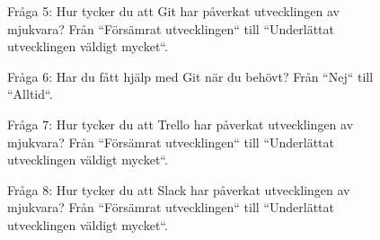 \begin{figure}[!h]
	\centering
	\caption{Fråga 5: Hur tycker du att Git har påverkat utvecklingen av mjukvara? Från ``Försämrat utvecklingen`` till ``Underlättat utvecklingen väldigt mycket``.}
\end{figure}

\begin{figure}[!h]
	\centering
	\caption{Fråga 6: Har du fått hjälp med Git när du behövt? Från ``Nej`` till ``Alltid``.}
\end{figure}

\begin{figure}[!h]
	\centering
	\caption{Fråga 7: Hur tycker du att Trello har påverkat utvecklingen av mjukvara? Från ``Försämrat utvecklingen`` till ``Underlättat utvecklingen väldigt mycket``.}
\end{figure}

\begin{figure}[!h]
	\centering
	\caption{Fråga 8: Hur tycker du att Slack har påverkat utvecklingen av mjukvara? Från ``Försämrat utvecklingen`` till ``Underlättat utvecklingen väldigt mycket``.}
\end{figure}

